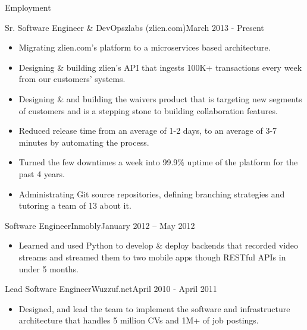 \documentclass[]{mcdowellcv}
\begin{document}
	\makeheader
	
	
	\begin{cvsection}{Employment}
		\begin{cvsubsection}{Sr. Software Engineer \& DevOps}{zlabs (zlien.com)}{March 2013 - Present}
		\begin{itemize}
				\item Migrating zlien.com's platform to a microservices based architecture.
				\item Designing \& building zlien's API that ingests 100K+ transactions every week from our customers' systems.
				\item Designing \& and building the waivers product that is targeting new segments of customers and is a stepping stone to building collaboration features.
				\item Reduced release time from an average of 1-2 days, to an average of 3-7 minutes by automating the process.
				\item Turned the few downtimes a week into 99.9\% uptime of the platform for the past 4 years.
				\item Administrating Git source repositories, defining branching strategies and tutoring a team of 13 about it.
			\end{itemize}
		\end{cvsubsection}
		
		\begin{cvsubsection}{Software Engineer}{Inmobly}{January 2012 – May 2012}		
			\begin{itemize}
				\item Learned and used Python to develop \& deploy backends that recorded video streams and streamed them to two mobile apps though RESTful APIs in under 5 months.
			\end{itemize}
		\end{cvsubsection}
		
		\begin{cvsubsection}{Lead Software Engineer}{Wuzzuf.net}{April 2010 - April 2011}			
			\begin{itemize}
				\item Designed, and lead the team to implement the software and infrastructure architecture that handles 5 million CVs and 1M+ of job postings.
			\end{itemize}
		\end{cvsubsection}
	

\end{cvsection}
\end{document}
